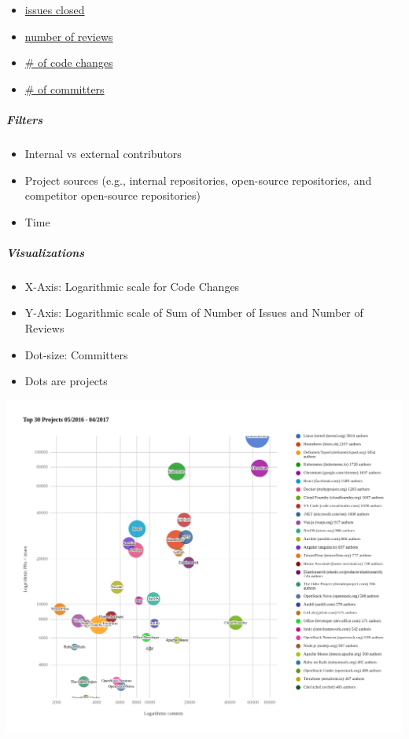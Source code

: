 \begin{itemize}
\tightlist
\item
  \href{https://github.com/chaoss/wg-evolution/blob/master/metrics/Issues_Closed.md}{issues
  closed}
\item
  \href{https://github.com/chaoss/wg-evolution/blob/master/metrics/Reviews.md}{number
  of reviews}
\item
  \href{https://github.com/chaoss/wg-evolution/blob/master/metrics/Code_Changes.md}{\#
  of code changes}
\item
  \href{https://github.com/chaoss/wg-risk/blob/master/metrics/Committers.md}{\#
  of committers}
\end{itemize}

\hypertarget{filters}{%
\subparagraph{Filters}\label{filters}}

\begin{itemize}
\tightlist
\item
  Internal vs external contributors
\item
  Project sources (e.g., internal repositories, open-source
  repositories, and competitor open-source repositories)
\item
  Time
\end{itemize}

\hypertarget{visualizations}{%
\subparagraph{Visualizations}\label{visualizations}}

\begin{itemize}
\tightlist
\item
  X-Axis: Logarithmic scale for Code Changes
\item
  Y-Axis: Logarithmic scale of Sum of Number of Issues and Number of
  Reviews
\item
  Dot-size: Committers
\item
  Dots are projects
\end{itemize}

\includegraphics{images/project-velocity_visualization.png}

